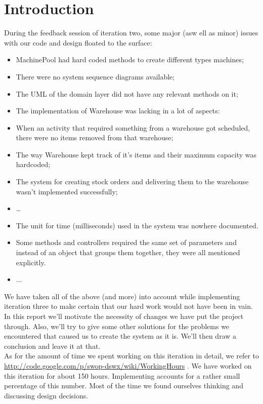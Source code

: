 \documentclass[12pt]{article}
\begin{document}
\section{Introduction}
During the feedback session of iteration two, some major (asw ell as minor) issues with our code and design floated to the surface:
\begin{itemize}
\item{MachinePool had hard coded methods to create different types machines;}
\item{There were no system sequence diagrams available;}
\item{The UML of the domain layer did not have any relevant methods on it;}
\item{The implementation of Warehouse was lacking in a lot of aspects: }

\item{When an activity that required something from a warehouse got scheduled, there were no items removed from that warehouse;}
\item{The way Warehouse kept track of it's items and their maximum capacity was hardcoded;}
\item{The system for creating stock orders and delivering them to the warehouse wasn't implemented successfully;}
\item{\dots}
\item{The unit for time (milliseconds) used in the system was nowhere documented.}
\item{Some methods and controllers required the same set of parameters and instead of an object that groups them together, they were all mentioned explicitly.}
\item{...}
\end{itemize}
We have taken all of the above (and more) into account while implementing iteration three to make certain that our hard work would not have been in vain.
In this report we'll motivate the necessity of changes we have put the project through. Also, we'll try to give some other solutions for the problems we encountered that caused us to create the system as it is. We'll then draw a conclusion and leave it at that. \\
\newline As for the amount of time we spent working on this iteration in detail, we refer to \url{http://code.google.com/p/swop-dswx/wiki/WorkingHours} . We have worked on this iteration for about 150 hours. Implementing accounts for a rather small percentage of this number. Most of the time we found ourselves thinking and discussing design decisions.
\end{document}

